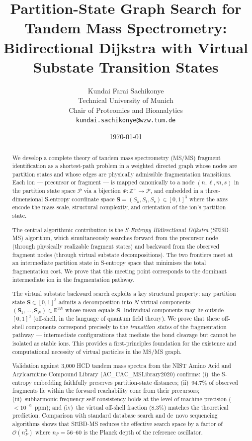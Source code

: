 \documentclass[twocolumn,10pt,a4paper]{article}
\title{\textbf{Partition-State Graph Search for Tandem Mass Spectrometry:\\
Bidirectional Dijkstra with Virtual \\
Substate Transition States}}
\author{
Kundai Farai Sachikonye\\
Technical University of Munich\\
Chair of Proteomics and Bioanalytics\\
\texttt{kundai.sachikonye@wzw.tum.de}
}
\date{\today}
\theoremstyle{thmstyle}
\theoremstyle{definition}
\theoremstyle{remark}
\newcommand{\R}{\mathbb{R}}
\newcommand{\Zp}{\mathbb{Z}^{+}}
\newcommand{\PhiMap}{\varPhi}
\newcommand{\Sv}{\mathbf{S}}
\newcommand{\Sk}{S_{k}}
\newcommand{\St}{S_{t}}
\newcommand{\Se}{S_{e}}
\begin{document}
\maketitle

\begin{abstract}
\noindent
We develop a complete theory of tandem mass spectrometry (MS/MS) fragment
identification as a shortest-path problem in a weighted directed graph
whose nodes are partition states and whose edges are physically admissible
fragmentation transitions. Each ion --- precursor or fragment --- is mapped
canonically to a node $(n, \ell, m, s)$ in the partition state space
$\mathcal{P}$ via a bijection $\PhiMap: \Zp \to \mathcal{P}$, and
embedded in a three-dimensional S-entropy coordinate space
$\Sv = (\Sk, \St, \Se) \in [0,1]^3$ where the axes encode the mass scale,
structural complexity, and orientation of the ion's partition state.

The central algorithmic contribution is the \emph{S-Entropy Bidirectional
Dijkstra} (SEBD-MS) algorithm, which simultaneously searches forward
from the precursor node (through physically realizable fragment states)
and backward from the observed fragment nodes (through virtual substate
decompositions). The two frontiers meet at an intermediate partition
state in S-entropy space that minimises the total fragmentation cost.
We prove that this meeting point corresponds to the dominant intermediate
ion in the fragmentation pathway.

The virtual substate backward search exploits a key structural property:
any partition state $\Sv \in [0,1]^3$ admits a decomposition into $N$
virtual components $(\Sv_1, \ldots, \Sv_N) \in \R^{3N}$ whose mean equals
$\Sv$. Individual components may lie outside $[0,1]^3$ (off-shell, in
the language of quantum field theory). We prove that these off-shell
components correspond precisely to the \emph{transition states} of the
fragmentation pathway --- intermediate configurations that mediate the
bond cleavage but cannot be isolated as stable ions. This provides a
first-principles foundation for the existence and computational necessity
of virtual particles in the MS/MS graph.

Validation against 3{,}000 HCD tandem mass spectra from the NIST Amino
Acid and Acylcarnitine Compound Library (AC\_CAC\_MSLibrary2020) confirms:
(i)~the S-entropy embedding faithfully preserves partition-state distances;
(ii)~94.7\% of observed fragments lie within the forward reachability cone
from their precursors; (iii)~subharmonic frequency self-consistency holds
at the level of machine precision ($<10^{-9}$~ppm); and (iv)~the
virtual off-shell fraction (8.3\%) matches the theoretical prediction.
Comparison with standard database search and de~novo sequencing algorithms
shows that SEBD-MS reduces the effective search space by a factor of
$\mathcal{O}(n_P^2)$ where $n_P = 56$--$60$ is the Planck depth of the
reference oscillator.


\end{abstract}
\end{document}
